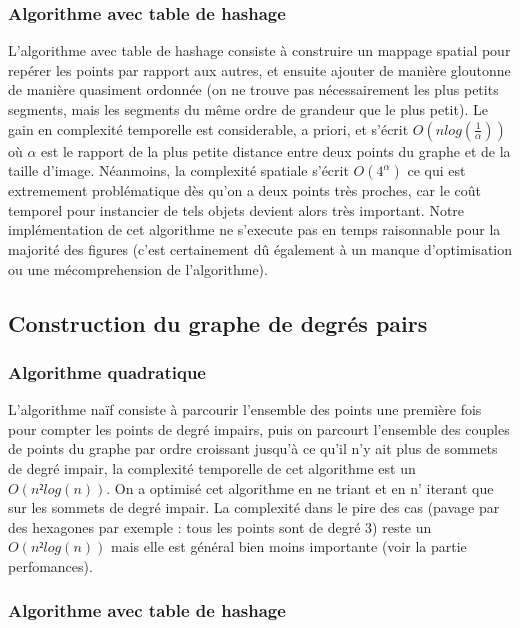 \documentclass[a4paper,11pt]{article}
\begin{document}
\subsubsection{Algorithme avec table de hashage}

L'algorithme avec table de hashage consiste à construire un mappage spatial pour repérer les points par rapport
aux autres, et ensuite ajouter de manière gloutonne de manière quasiment ordonnée (on ne trouve pas nécessairement
les plus petits segments, mais les segments du même ordre de grandeur que le plus petit). Le gain en complexité temporelle
est considerable, a priori, et s'écrit $O(nlog(\frac{1}{\alpha}))$ où $\alpha$ est le rapport de la plus petite distance entre deux points du graphe et de la taille d'image.
Néanmoins, la complexité spatiale s'écrit $O(4^{\alpha})$ ce qui est extremement problématique dès qu'on a deux points très proches,
car le coût temporel pour instancier de tels objets devient alors très important.
Notre implémentation de cet algorithme ne s'execute pas en temps raisonnable pour la majorité des figures (c'est certainement dû
également à un manque d'optimisation ou une mécomprehension de l'algorithme).
\subsection{Construction du graphe de degrés pairs}

\subsubsection{Algorithme quadratique}

L'algorithme naïf consiste à parcourir l'ensemble des points une première fois pour compter les points de degré impairs,
puis on parcourt l'ensemble des couples de points du graphe par ordre croissant jusqu'à ce qu'il n'y ait plus de sommets de
degré impair, la complexité temporelle de cet algorithme est un $O(n²log(n))$. On a optimisé cet algorithme en ne triant et en n'
iterant que sur les sommets de degré impair. La complexité dans le pire des cas (pavage par des hexagones par exemple : tous les points sont de degré 3) reste un $O(n²log(n))$ mais elle est général bien
moins importante (voir la partie perfomances).

\subsubsection{Algorithme avec table de hashage}
\end{document}
